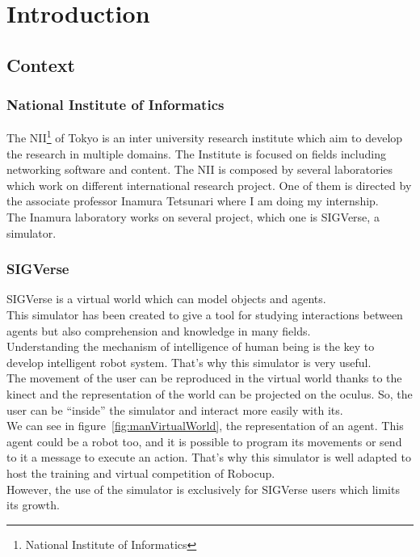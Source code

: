 \chapter{Introduction}
\setlength{\parskip}{2.5ex plus .4ex minus .4ex}
\section{Context}
\subsection{National Institute of Informatics}
The NII\footnote{National Institute of Informatics} of Tokyo is an inter university research institute which aim to develop the research in multiple domains. The Institute is focused on fields including networking software and content.
The NII is composed by several laboratories which work on different international research project. One of them is directed by the associate professor Inamura Tetsunari where I am doing my internship.\\
The Inamura laboratory works on several project, which one is SIGVerse, a simulator.

\subsection{SIGVerse}
SIGVerse is a virtual world which can model objects and agents.\\
This simulator has been created to give a tool for studying interactions between agents but also comprehension and knowledge in many fields.\\
Understanding the mechanism of intelligence of human being is the key to develop intelligent robot system. That's why this simulator is very useful.\\
The movement of the user can be reproduced in the virtual world thanks to the kinect and the representation of the world can be projected on the oculus. So, the user can be ``inside'' the simulator and interact more easily with its.\\
We can see in figure~\ref{fig:manVirtualWorld}, the representation of an agent. This agent could be a robot too, and it is possible to program its movements or send to it a message to execute an action. That's why this simulator is well adapted to host the training and virtual competition of Robocup.\\
However, the use of the simulator is exclusively for SIGVerse users which limits its growth.\\

